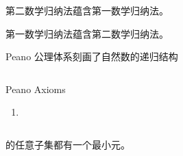 \begin{frame}{}
  \begin{lemma}
    第二数学归纳法蕴含第一数学归纳法。
  \end{lemma}
\end{frame}

\begin{frame}{}
  \begin{lemma}
    第一数学归纳法蕴含第二数学归纳法。
  \end{lemma}
\end{frame}

\begin{frame}{}
  \begin{center}
  \end{center}
\end{frame}

\begin{frame}{}
  \begin{center}
    Peano 公理体系刻画了自然数的递归结构
  \end{center}

  \begin{columns}
      \begin{definition}{Peano Axioms}
        \begin{enumerate}[(1)]
          \item 
        \end{enumerate}
      \end{definition}
  \end{columns}
\end{frame}

\begin{frame}{}
  \begin{definition}
    的任意子集都有一个最小元。
  \end{definition}
\end{frame}

\begin{frame}{}
  \begin{theorem}{}
  \end{theorem}
\end{frame}
